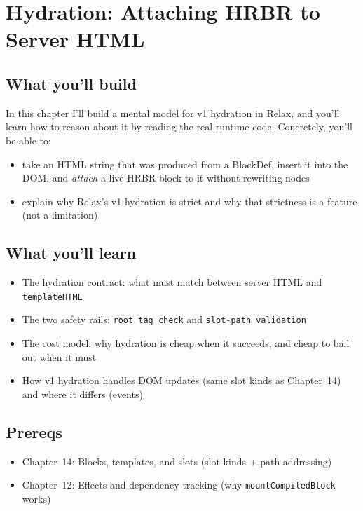 \chapter{Hydration: Attaching HRBR to Server HTML}

\section*{What you'll build}

In this chapter I’ll build a mental model for v1 hydration in Relax, and you’ll learn how to reason about it by reading the real runtime code.
Concretely, you’ll be able to:

\begin{itemize}
  \item take an HTML string that was produced from a BlockDef, insert it into the DOM, and \emph{attach} a live HRBR block to it without rewriting nodes
  \item explain why Relax’s v1 hydration is strict and why that strictness is a feature (not a limitation)
\end{itemize}

\section*{What you'll learn}

\begin{itemize}
  \item The hydration contract: what must match between server HTML and \texttt{templateHTML}
  \item The two safety rails: \texttt{root tag check} and \texttt{slot-path validation}
  \item The cost model: why hydration is cheap when it succeeds, and cheap to bail out when it must
  \item How v1 hydration handles DOM updates (same slot kinds as Chapter~14) and where it differs (events)
\end{itemize}

\section*{Prereqs}

\begin{itemize}
  \item Chapter~14: Blocks, templates, and slots (slot kinds + path addressing)
  \item Chapter~12: Effects and dependency tracking (why \texttt{mountCompiledBlock} works)
\end{itemize}

